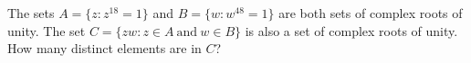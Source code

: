 The sets $A = \{z : z^{18} = 1\}$ and $B = \{w : w^{48} = 1\}$ are both sets of complex roots of unity.  The set $C = \{zw : z \in A \ \text{and} \ w \in B\}$ is also a set of complex roots of unity.  How many distinct elements are in $C$?